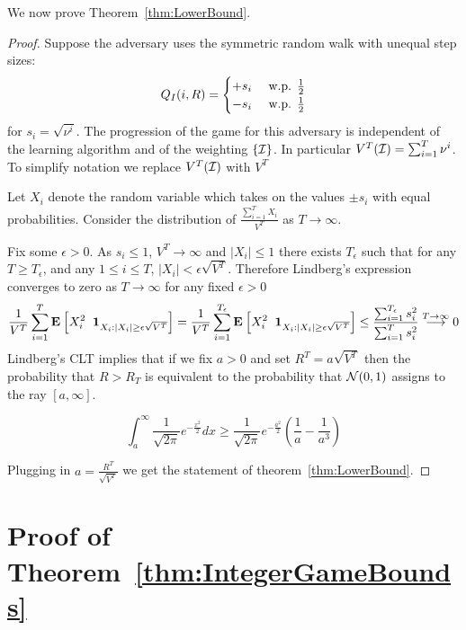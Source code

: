 \documentclass[anon,12pt]{colt2024} %
\begin{document}
\noindent We now prove Theorem~\ref{thm:LowerBound}.
\begin{proof}
Suppose the adversary uses the symmetric random walk with unequal step sizes:
\begin{equation}
Q_I(i,R) =
  \begin{cases}
    +s_i & \mbox{ w.p. } \frac{1}{2}\\
    -s_i & \mbox{ w.p. } \frac{1}{2}\\
  \end{cases}
\end{equation}
for $s_i = \sqrt{\nu^i}$. The progression of the game for this
adversary is independent of the learning algorithm and of the
weighting $\{\cal I\}$. In particular
$V^T({\cal I}) = \sum_{i=1}^T \nu^i$. To simplify notation we replace
$V^T({\cal I})$ with $V^T$

Let $X_i$ denote the random variable which takes on the values
$\pm s_i$ with equal probabilities. Consider the distribution of $\frac{\sum_{i=1}^T X_i}{V^T}$
as $T \to \infty$.


Fix some $\epsilon>0$. As $s_i \leq 1$, $V^T \to \infty$ and
$|X_i| \leq 1$ there exists $T_{\epsilon}$ such that for any
$T \geq T_{\epsilon}$, and any $1 \leq i \leq T$,
$|X_i| < \epsilon \sqrt{V^T}$. Therefore Lindberg's expression
converges to zero as $T \to \infty$ for any fixed $\epsilon>0$
\[
  \frac{1}{V^T}\sum_{i=1}^T {\bf E}_{}\left[ X_i^2 \;\;{\bf 1}_{X_i: |X_i| \geq \epsilon \sqrt{V^T} }  \right] = 
    \frac{1}{V^T}\sum_{i=1}^{T_\epsilon} {\bf E}_{}\left[ X_i^2 \;\;{\bf 1}_{X_i: |X_i| \geq \epsilon \sqrt{V^T} }  \right]
    \leq \frac{\sum_{i=1}^{T_\epsilon} s_i^2}{\sum_{i=1}^{T} s_i^2}
    \stackrel{T \to \infty}{\longrightarrow} 0
  \]
  Lindberg's CLT implies that if we fix $a>0$ and set $R^T=a \sqrt{V^T}$ then the probability that
  $R>R_T$ is equivalent to the probability that ${\cal N}(0,1)$ assigns to the
  ray $[a,\infty]$.

  \[
    \int_a^\infty \frac{1}{\sqrt{2 \pi}} e^{-\frac{x^2}{2}} dx
    \geq \frac{1}{\sqrt{2 \pi}} e^{-\frac{a^2}{2}}
    \left( \frac{1}{a} - \frac{1}{a^3}\right)
  \]

Plugging in $a=\frac{R^T}{\sqrt{V^T}}$ we get the statement of theorem~\ref{thm:LowerBound}.
  
  \end{proof}

 




\appendix

\section{Proof of Theorem~\ref{thm:IntegerGameBounds}}
\end{document}
